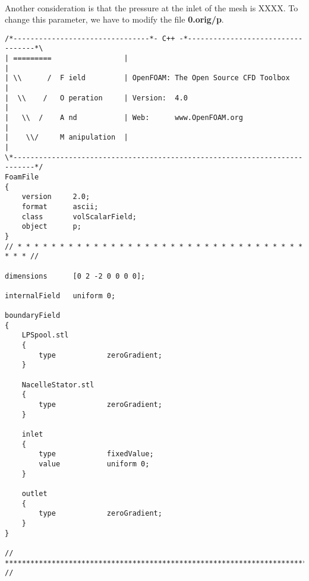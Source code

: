 \paragraph{}
Another consideration is that the pressure at the inlet of the mesh is  XXXX. To change this parameter, we have to modify the file \textbf{0.orig/p}.

\begin{footnotesize}

\begin{verbatim}
/*--------------------------------*- C++ -*----------------------------------*\
| =========                 |                                                 |
| \\      /  F ield         | OpenFOAM: The Open Source CFD Toolbox           |
|  \\    /   O peration     | Version:  4.0                                   |
|   \\  /    A nd           | Web:      www.OpenFOAM.org                      |
|    \\/     M anipulation  |                                                 |
\*---------------------------------------------------------------------------*/
FoamFile
{
    version     2.0;
    format      ascii;
    class       volScalarField;
    object      p;
}
// * * * * * * * * * * * * * * * * * * * * * * * * * * * * * * * * * * * * * //

dimensions      [0 2 -2 0 0 0 0];

internalField   uniform 0;

boundaryField
{
    LPSpool.stl
    {
        type            zeroGradient;
    }

    NacelleStator.stl
    {
        type            zeroGradient;
    }

    inlet
    {
        type            fixedValue;
	    value		    uniform 0;
    }

    outlet
    {
        type            zeroGradient;
    }
}

// ************************************************************************* //

\end{verbatim}

\end{footnotesize}
